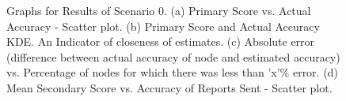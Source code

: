 \documentclass[journal]{IEEEtran}
\begin{document}
\begin{figure}[!ht]
	\caption{Graphs for Results of Scenario 0. (a) Primary Score vs. Actual Accuracy - Scatter plot. (b) Primary Score and Actual Accuracy KDE. An Indicator of closeness of estimates. (c) Absolute error (difference between actual accuracy of node and estimated accuracy) vs. Percentage of nodes for which there was less than 'x'\% error. (d) Mean Secondary Score vs. Accuracy of Reports Sent - Scatter plot.}
	\label{fig:apdx:sc0}
	\centering
	\hfill
\end{figure}
\end{document}
